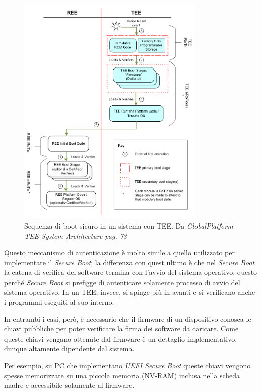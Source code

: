 \documentclass[12pt,italian]{report}
\begin{document}
\begin{figure}
\centering
\includegraphics[width=0.8\textwidth]{immagini/tee-boot-sequence}
\caption{
    Sequenza di boot sicuro in un sistema con TEE. 
    Da \textit{GlobalPlatform TEE System Architecture pag. 73}
    \cite{gp2020systemarchitecture}
}
\end{figure}

Questo meccanismo di autenticazione è molto simile a quello utilizzato per
implementare il \textit{Secure Boot}; la differenza con quest ultimo è che
nel \textit{Secure Boot} la catena di verifica del software termina con
l'avvio del sistema operativo, questo perché \textit{Secure Boot} si prefigge
di autenticare solamente processo di avvio del sistema operativo.
In un TEE, invece, si spinge più in avanti e si verificano anche i programmi
eseguiti al suo interno.

In entrambi i casi, però, è necessario che il firmware di un dispositivo
conosca le chiavi pubbliche per poter verificare la firma dei software
da caricare. Come queste chiavi vengano ottenute dal firmware è un dettaglio
implementativo, dunque altamente dipendente dal sistema.

Per esempio, su PC che implementano \textit{UEFI Secure Boot} queste chiavi
vengono spesse memorizzate su una piccola memoria (NV-RAM) inclusa
nella scheda madre e accessibile
solamente al firmware\cite{windows_secure_boot}.
\end{document}

